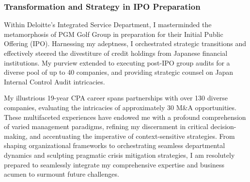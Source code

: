 \subsubsection{Transformation and Strategy in IPO Preparation}
Within Deloitte's Integrated Service Department, I masterminded the metamorphosis of PGM Golf Group in preparation for their Initial Public Offering (IPO). Harnessing my adeptness, I orchestrated strategic transitions and effectively steered the divestiture of credit holdings from Japanese financial institutions. My purview extended to executing post-IPO group audits for a diverse pool of up to 40 companies, and providing strategic counsel on Japan Internal Control Audit intricacies.

My illustrious 19-year CPA career spans partnerships with over 130 diverse companies, evaluating the intricacies of approximately 30 M\&A opportunities. These multifaceted experiences have endowed me with a profound comprehension of varied management paradigms, refining my discernment in critical decision-making, and accentuating the imperative of context-sensitive strategies. From shaping organizational frameworks to orchestrating seamless departmental dynamics and sculpting pragmatic crisis mitigation strategies, I am resolutely prepared to seamlessly integrate my comprehensive expertise and business acumen to surmount future challenges.




             
